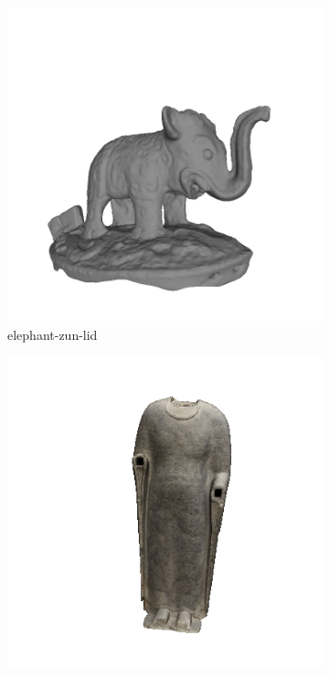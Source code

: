 \begin{figure}
	\begin{subfigure}[b]{0.23\linewidth}
		\includegraphics[width=\linewidth]{./Figures/train-dataset/44.elephant-zun-lid.png}
		\caption{elephant-zun-lid}
	\end{subfigure}
	\begin{subfigure}[b]{0.23\linewidth}
		\includegraphics[width=\linewidth]{./Figures/train-dataset/45.cosmic-buddha.png}

\end{subfigure}
\end{figure}
